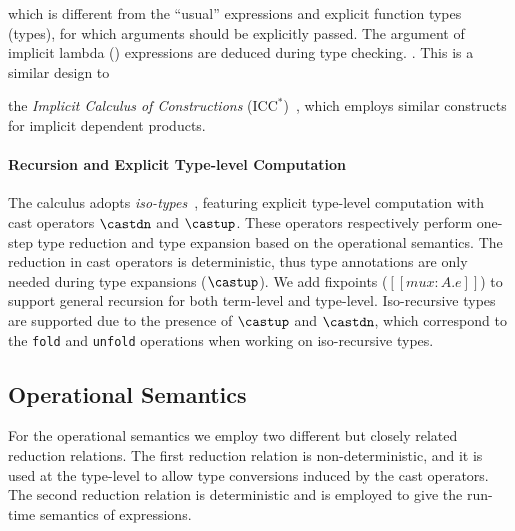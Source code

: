 which is different from the ``usual'' \lambda expressions and explicit function
types (\Pi types), for which arguments should be explicitly passed. The argument
of implicit lambda (\Lambda) expressions are deduced during type checking.
.
This is a similar design to

the \emph{Implicit Calculus of Constructions} ($\text{ICC}^*$)~\cite{barras2008implicit}, which
employs similar constructs for implicit dependent products.


\paragraph{Recursion and Explicit Type-level Computation}
\label{sec:cast}
The \name calculus adopts \emph{iso-types}~\cite{isotype,yang2019pure},
featuring explicit type-level computation with cast operators
$\castdn$ and $\castup$. These operators respectively perform one-step
type reduction and type expansion based on the operational semantics.
The reduction in cast operators is deterministic, thus type
annotations are only needed during type expansions ($\castup$). We add
fixpoints ($[[mu x : A. e]]$) to support general recursion for both
term-level and type-level. Iso-recursive types are supported due to
the presence of $\castup$ and $\castdn$, which correspond to the
\verb|fold| and \verb|unfold| operations when working on iso-recursive types.

\subsection{Operational Semantics}

For the operational semantics we employ two different but closely related
reduction relations. The first reduction relation is non-deterministic, and
it is used at the type-level to allow type conversions induced
by the cast operators. The second reduction relation is deterministic and
is employed to give the run-time semantics of expressions.

